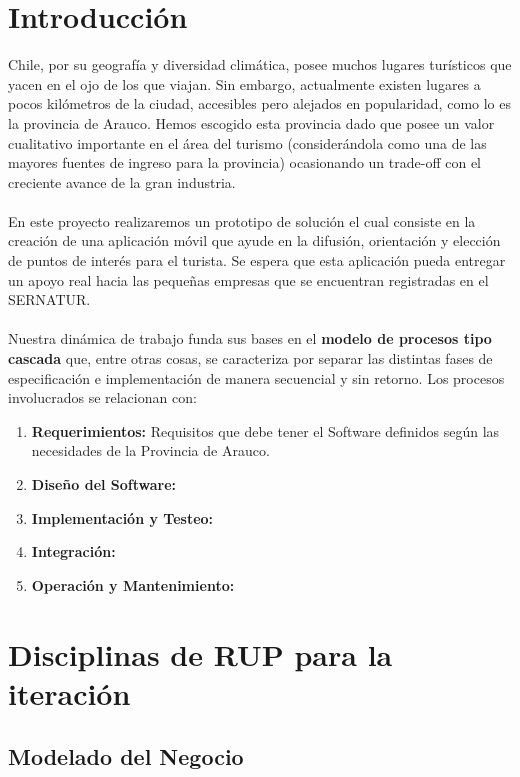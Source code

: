\documentclass[12pt]{article}
\begin{document}
\section{Introducción}
Chile, por su geografía y diversidad climática, posee muchos lugares turísticos que yacen en el ojo de los que viajan. Sin embargo, actualmente existen lugares a pocos kilómetros de la ciudad, accesibles pero alejados en popularidad, como lo es la provincia de Arauco. Hemos escogido esta provincia dado que posee un valor cualitativo importante en el área del turismo (considerándola como una de las mayores fuentes de ingreso para la provincia) ocasionando un trade-off con el creciente avance de la gran industria.\\\\En este proyecto realizaremos un prototipo de solución el cual consiste en la creación de una aplicación móvil que ayude en la difusión, orientación y elección de puntos de interés para el turista. Se espera que esta aplicación pueda entregar un apoyo real hacia las pequeñas empresas que se encuentran registradas en el SERNATUR.\\\\Nuestra dinámica de trabajo funda sus bases en el \textbf{modelo de procesos tipo cascada} que, entre otras cosas, se caracteriza por separar las distintas fases de especificación e implementación de manera secuencial y sin retorno. Los procesos involucrados se relacionan con:
\begin{enumerate}
\item \textbf{Requerimientos:} Requisitos que debe tener el Software definidos según las necesidades de la Provincia de Arauco.
\item \textbf{Diseño del Software:} 
\item \textbf{Implementación y Testeo:}
\item \textbf{Integración:}
\item \textbf{Operación y Mantenimiento:} 
\end{enumerate}  
\newpage
\section{Disciplinas de RUP para la iteración}
\subsection{Modelado del Negocio}
\end{document}
